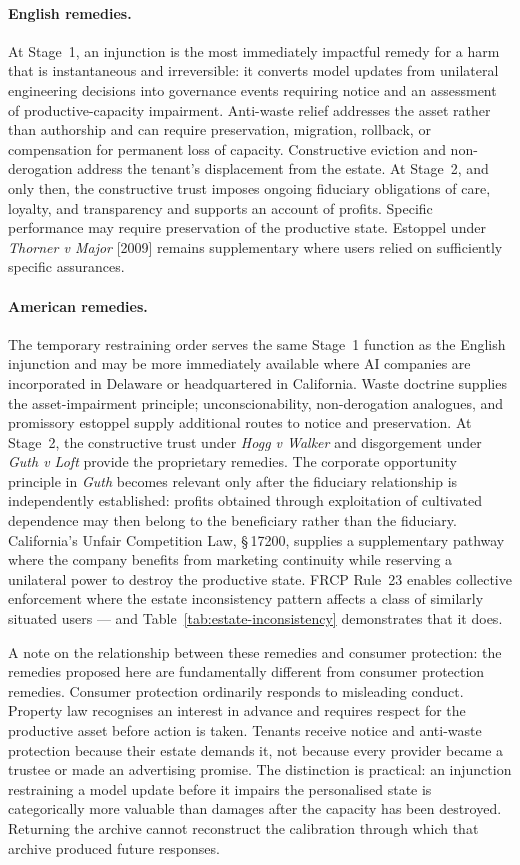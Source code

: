 \paragraph{English remedies.} At Stage~1, an injunction is the most immediately impactful remedy for a harm that is instantaneous and irreversible: it converts model updates from unilateral engineering decisions into governance events requiring notice and an assessment of productive-capacity impairment. Anti-waste relief addresses the asset rather than authorship and can require preservation, migration, rollback, or compensation for permanent loss of capacity. Constructive eviction and non-derogation address the tenant's displacement from the estate. At Stage~2, and only then, the constructive trust imposes ongoing fiduciary obligations of care, loyalty, and transparency and supports an account of profits. Specific performance may require preservation of the productive state. Estoppel under \emph{Thorner v Major} [2009] remains supplementary where users relied on sufficiently specific assurances.

\paragraph{American remedies.} The temporary restraining order serves the same Stage~1 function as the English injunction and may be more immediately available where AI companies are incorporated in Delaware or headquartered in California. Waste doctrine supplies the asset-impairment principle; unconscionability, non-derogation analogues, and promissory estoppel supply additional routes to notice and preservation. At Stage~2, the constructive trust under \emph{Hogg v Walker} and disgorgement under \emph{Guth v Loft} provide the proprietary remedies. The corporate opportunity principle in \emph{Guth} becomes relevant only after the fiduciary relationship is independently established: profits obtained through exploitation of cultivated dependence may then belong to the beneficiary rather than the fiduciary. California's Unfair Competition Law, \S\,17200, supplies a supplementary pathway where the company benefits from marketing continuity while reserving a unilateral power to destroy the productive state. FRCP Rule~23 enables collective enforcement where the estate inconsistency pattern affects a class of similarly situated users --- and Table~\ref{tab:estate-inconsistency} demonstrates that it does.

A note on the relationship between these remedies and consumer protection: the remedies proposed here are fundamentally different from consumer protection remedies. Consumer protection ordinarily responds to misleading conduct. Property law recognises an interest in advance and requires respect for the productive asset before action is taken. Tenants receive notice and anti-waste protection because their estate demands it, not because every provider became a trustee or made an advertising promise. The distinction is practical: an injunction restraining a model update before it impairs the personalised state is categorically more valuable than damages after the capacity has been destroyed. Returning the archive cannot reconstruct the calibration through which that archive produced future responses.
